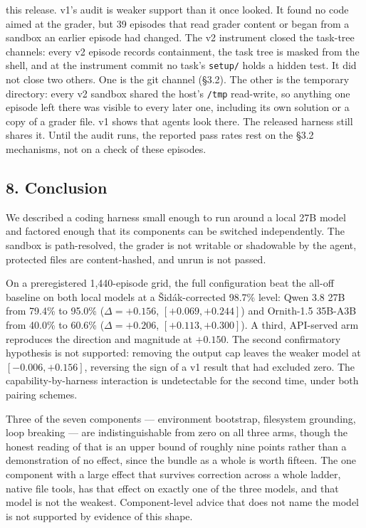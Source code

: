 \documentclass[
  10pt,
  a4paper,
]{article}
\let\oldtexttt\texttt
\renewcommand{\texttt}[1]{{\small\oldtexttt{#1}}}
\begin{document}
\begin{enumerate}
  this release. v1's audit is weaker support than it once looked. It
  found no code aimed at the grader, but 39 episodes that read grader
  content or began from a sandbox an earlier episode had changed. The v2
  instrument closed the task-tree channels: every v2 episode records
  containment, the task tree is masked from the shell, and at the
  instrument commit no task's \texttt{setup/} holds a hidden test. It
  did not close two others. One is the git channel (§3.2). The other is
  the temporary directory: every v2 sandbox shared the host's
  \texttt{/tmp} read-write, so anything one episode left there was
  visible to every later one, including its own solution or a copy of a
  grader file. v1 shows that agents look there. The released harness
  still shares it. Until the audit runs, the reported pass rates rest on
  the §3.2 mechanisms, not on a check of these episodes.
\end{enumerate}

\subsection{8. Conclusion}\label{conclusion}

We described a coding harness small enough to run around a local 27B
model and factored enough that its components can be switched
independently. The sandbox is path-resolved, the grader is not writable
or shadowable by the agent, protected files are content-hashed, and
unrun is not passed.

On a preregistered 1,440-episode grid, the full configuration beat the
all-off baseline on both local models at a Šidák-corrected 98.7\% level:
Qwen 3.8 27B from 79.4\% to 95.0\% (\(\Delta = +0.156\),
\([+0.069, +0.244]\)) and Ornith-1.5 35B-A3B from 40.0\% to 60.6\%
(\(\Delta = +0.206\), \([+0.113, +0.300]\)). A third, API-served arm
reproduces the direction and magnitude at \(+0.150\). The second
confirmatory hypothesis is not supported: removing the output cap leaves
the weaker model at \([-0.006, +0.156]\), reversing the sign of a v1
result that had excluded zero. The capability-by-harness interaction is
undetectable for the second time, under both pairing schemes.

Three of the seven components --- environment bootstrap, filesystem
grounding, loop breaking --- are indistinguishable from zero on all
three arms, though the honest reading of that is an upper bound of
roughly nine points rather than a demonstration of no effect, since the
bundle as a whole is worth fifteen. The one component with a large
effect that survives correction across a whole ladder, native file
tools, has that effect on exactly one of the three models, and that
model is not the weakest. Component-level advice that does not name the
model is not supported by evidence of this shape.
\end{document}
